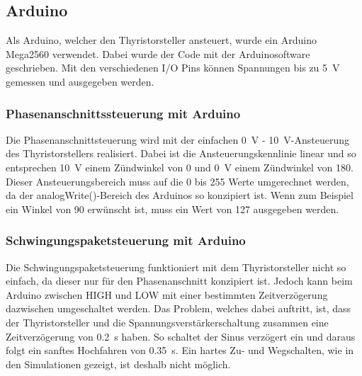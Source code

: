 \subsection{Arduino}

Als Arduino, welcher den Thyristorsteller ansteuert, wurde ein Arduino Mega2560 verwendet. Dabei wurde der Code mit der Arduinosoftware geschrieben. Mit den verschiedenen I/O Pins können Spannungen bis zu \SI{5}{V} gemessen und ausgegeben werden.
 

\subsubsection*{Phasenanschnittssteuerung mit Arduino}
Die Phasenanschnittsteuerung wird mit der einfachen \SI{0}{V} - \SI{10}{V}-Ansteuerung des Thyristorstellers realisiert. Dabei ist die Ansteuerungskennlinie linear und so entsprechen \SI{10}{V} einem Zündwinkel von 0\textdegree\hspace{0.02cm} und \SI{0}{V} einem Zündwinkel von 180\textdegree. Dieser Ansteuerungsbereich muss auf die 0 bis 255 Werte umgerechnet werden, da der analogWrite()-Bereich des Arduinos so konzipiert ist. Wenn zum Beispiel ein Winkel von 90\textdegree \hspace{0.02cm} erwünscht ist, muss ein Wert von 127 ausgegeben werden.

\subsubsection*{Schwingungspaketsteuerung mit Arduino}
Die Schwingungspaketsteuerung funktioniert mit dem Thyristorsteller nicht so einfach, da dieser nur für den Phasenanschnitt konzipiert ist. Jedoch kann beim Arduino zwischen HIGH und LOW mit einer bestimmten Zeitverzögerung dazwischen umgeschaltet werden. Das Problem, welches dabei auftritt, ist, dass der Thyristorsteller und die Spannungsverstärkerschaltung zusammen eine Zeitverzögerung von \SI{0.2}{s} haben. So schaltet der Sinus verzögert ein und daraus folgt ein sanftes Hochfahren von \SI{0.35}{s}. Ein hartes Zu- und Wegschalten, wie in den Simulationen gezeigt, ist deshalb nicht möglich.


